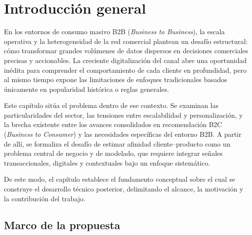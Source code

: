 
\chapter{Introducción general} %

\label{Chapter1} %
\label{IntroGeneral}

En los entornos de consumo masivo B2B (\textit{Business to Business}), la escala operativa y la heterogeneidad de la red comercial plantean un desafío estructural: cómo transformar grandes volúmenes de datos dispersos en decisiones comerciales precisas y accionables. La creciente digitalización del canal abre una oportunidad inédita para comprender el comportamiento de cada cliente en profundidad, pero al mismo tiempo expone las limitaciones de enfoques tradicionales basados únicamente en popularidad histórica o reglas generales.

Este capítulo sitúa el problema dentro de ese contexto. Se examinan las particularidades del sector, las tensiones entre escalabilidad y personalización, y la brecha existente entre los avances consolidados en recomendación B2C (\textit{Business to Consumer}) y las necesidades específicas del entorno B2B. A partir de allí, se formaliza el desafío de estimar afinidad cliente–producto como un problema central de negocio y de modelado, que requiere integrar señales transaccionales, digitales y contextuales bajo un enfoque sistemático.

De este modo, el capítulo establece el fundamento conceptual sobre el cual se construye el desarrollo técnico posterior, delimitando el alcance, la motivación y la contribución del trabajo.


\newcommand{\keyword}[1]{\textbf{#1}}
\newcommand{\tabhead}[1]{\textbf{#1}}
\newcommand{\code}[1]{\texttt{#1}}
\newcommand{\file}[1]{\texttt{\bfseries#1}}
\newcommand{\option}[1]{\texttt{\itshape#1}}
\newcommand{\grados}{$^{\circ}$}


\section{Marco de la propuesta}


